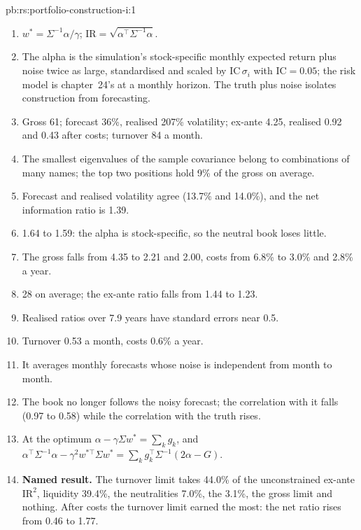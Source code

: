 \begin{solution}{pb:rs:portfolio-construction-i:1}
\begin{enumerate}
\item $w^* = \Sigma^{-1}\alpha/\gamma$; $\mathrm{IR} = \sqrt{\alpha^\top\Sigma^{-1}\alpha}$.
\item The alpha is the simulation's stock-specific monthly expected return plus noise twice as large, standardised and scaled by $\mathrm{IC}\,\sigma_i$ with
$\mathrm{IC} = 0.05$; the risk model is chapter~24's at a monthly horizon. The truth plus noise isolates construction from forecasting.
\item Gross 61; forecast 36\%, realised 207\% volatility; ex-ante 4.25, realised 0.92 and 0.43 after costs; turnover 84 a month.
\item The smallest eigenvalues of the sample covariance belong to combinations of many names; the top two positions hold 9\% of the gross on average.
\item Forecast and realised volatility agree (13.7\% and 14.0\%), and the net information ratio is 1.39.
\item 1.64 to 1.59: the alpha is stock-specific, so the neutral book loses little.
\item The gross falls from 4.35 to 2.21 and 2.00, costs from 6.8\% to 3.0\% and 2.8\% a year.
\item 28 on average; the ex-ante ratio falls from 1.44 to 1.23.
\item Realised ratios over 7.9 years have standard errors near 0.5.
\item Turnover 0.53 a month, costs 0.6\% a year.
\item It averages monthly forecasts whose noise is independent from month to month.
\item The book no longer follows the noisy forecast; the correlation with it falls (0.97 to 0.58) while the correlation with the truth rises.
\item At the optimum $\alpha - \gamma\Sigma w^* = \sum_k g_k$, and $\alpha^\top\Sigma^{-1}\alpha - \gamma^2 w^{*\top}\Sigma w^* = \sum_k g_k^\top\Sigma^{-1}(2\alpha - G)$.
\item \textbf{Named result.} The turnover limit takes 44.0\% of the unconstrained ex-ante $\mathrm{IR}^2$, liquidity 39.4\%, the neutralities 7.0\%, the 
3.1\%, the gross limit and  nothing. After costs the turnover limit earned the most: the net ratio rises from 0.46 to 1.77.

\end{enumerate}
\end{solution}
